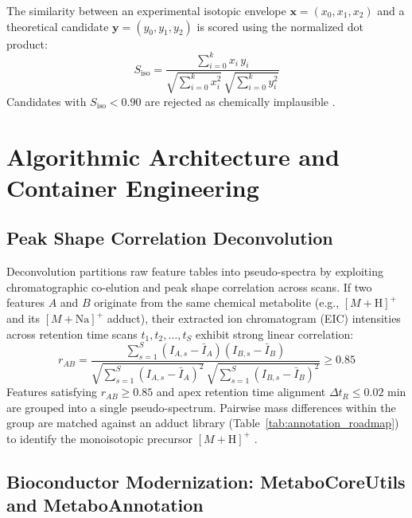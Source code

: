 \documentclass[11pt,twoside,openright]{book}
\begin{document}
\vspace{0.6em}
The similarity between an experimental isotopic envelope $\mathbf{x} = (x_0, x_1, x_2)$ and a theoretical candidate $\mathbf{y} = (y_0, y_1, y_2)$ is scored using the normalized dot product:
\begin{equation}
S_{\text{iso}} = \frac{\sum_{i=0}^k x_i \, y_i}{\sqrt{\sum_{i=0}^k x_i^2} \, \sqrt{\sum_{i=0}^k y_i^2}}
\label{eq:iso_score}
\end{equation}
Candidates with $S_{\text{iso}} < 0.90$ are rejected as chemically implausible \cite{duehrkop2019sirius, tsugawa2015msdial}.

\section{Algorithmic Architecture and Container Engineering}

\subsection{Peak Shape Correlation Deconvolution}

Deconvolution partitions raw feature tables into pseudo-spectra by exploiting chromatographic co-elution and peak shape correlation across scans. If two features $A$ and $B$ originate from the same chemical metabolite (e.g., $[M+\text{H}]^+$ and its $[M+\text{Na}]^+$ adduct), their extracted ion chromatogram (EIC) intensities across retention time scans $t_1, t_2, \dots, t_S$ exhibit strong linear correlation:
\begin{equation}
r_{AB} = \frac{\sum_{s=1}^S (I_{A, s} - \bar{I}_A)(I_{B, s} - \bar{I}_B)}{\sqrt{\sum_{s=1}^S (I_{A, s} - \bar{I}_A)^2} \, \sqrt{\sum_{s=1}^S (I_{B, s} - \bar{I}_B)^2}} \ge 0.85
\label{eq:eic_cor}
\end{equation}
Features satisfying $r_{AB} \ge 0.85$ and apex retention time alignment $\Delta t_R \le 0.02$ min are grouped into a single pseudo-spectrum. Pairwise mass differences within the group are matched against an adduct library (Table~\ref{tab:annotation_roadmap}) to identify the monoisotopic precursor $[M+\text{H}]^+$ \cite{kuhl2012camera, pluskal2010mzmine}.

\subsection{Bioconductor Modernization: MetaboCoreUtils and MetaboAnnotation}
\end{document}
